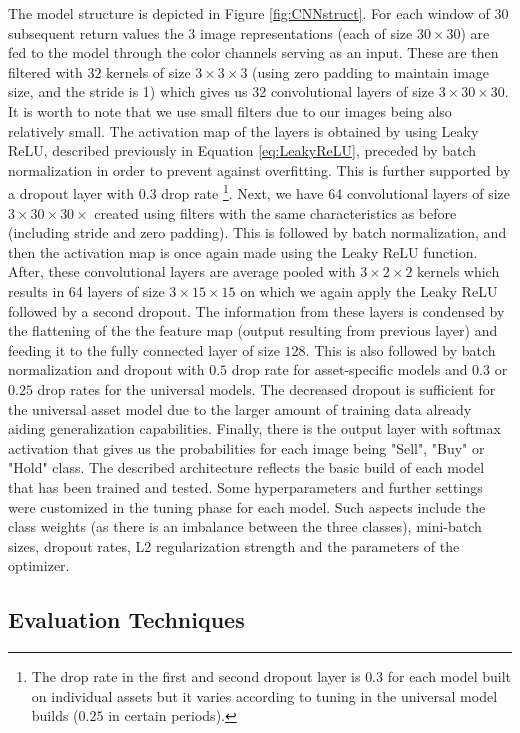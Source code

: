\documentclass[11pt, a4paper]{article}
\begin{document}
The model structure is depicted in Figure \ref{fig:CNNstruct}. For each window of 30 subsequent return values the 3 image representations (each of size $30 \times 30$) are fed to the model through the color channels serving as an input. These are then filtered with $32$ kernels of size $3 \times 3 \times 3$ (using zero padding to maintain image size, and the stride is 1) which gives us 32 convolutional layers of size $3 \times 30 \times 30$. It is worth to note that we use small filters due to our images being also relatively small. The activation map of the layers is obtained by using Leaky ReLU, described previously in Equation \ref{eq:LeakyReLU}, preceded by batch normalization in order to prevent against overfitting. This is further supported by a dropout layer with $0.3$ drop rate \footnote{The drop rate in the first and second dropout layer is $0.3$ for each model built on individual assets but it varies according to tuning in the universal model builds ($0.25$ in certain periods).}. Next, we have 64 convolutional layers of size $3 \times 30 \times 30 \times$ created using filters with the same characteristics as before (including stride and zero padding). This is followed by batch normalization, and then the activation map is once again made using the Leaky ReLU function. After, these convolutional layers are average pooled with $3 \times 2 \times 2$ kernels which results in 64 layers of size $3 \times 15 \times 15$ on which we again apply the Leaky ReLU followed by a second dropout. The information from these layers is condensed by the flattening of the the feature map (output resulting from previous layer) and feeding it to the fully connected layer of size $128$. This is also followed by batch normalization and dropout with $0.5$ drop rate for asset-specific models and $0.3$ or $0.25$ drop rates for the universal models. The decreased dropout is sufficient for the universal asset model due to the larger amount of training data already aiding generalization capabilities. Finally, there is the output layer with softmax activation that gives us the probabilities for each image being "Sell", "Buy" or "Hold" class. The described architecture reflects the basic build of each model that has been trained and tested. Some hyperparameters and further settings were customized in the tuning phase for each model. Such aspects include the class weights (as there is an imbalance between the three classes), mini-batch sizes, dropout rates, L2 regularization strength and the parameters of the optimizer.

\subsection{Evaluation Techniques}
\label{subsec:DM:Eval}
\end{document}
